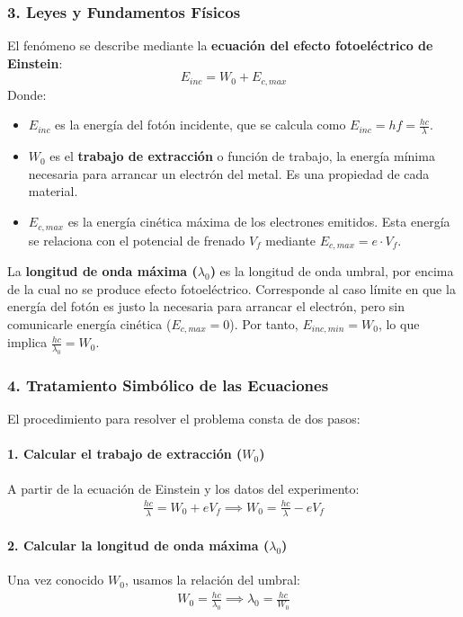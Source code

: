 \subsubsection*{3. Leyes y Fundamentos Físicos}
El fenómeno se describe mediante la \textbf{ecuación del efecto fotoeléctrico de Einstein}:
$$ E_{inc} = W_0 + E_{c,max} $$
\newpage
Donde:
\begin{itemize}
    \item $E_{inc}$ es la energía del fotón incidente, que se calcula como $E_{inc} = hf = \frac{hc}{\lambda}$.
    \item $W_0$ es el \textbf{trabajo de extracción} o función de trabajo, la energía mínima necesaria para arrancar un electrón del metal. Es una propiedad de cada material.
    \item $E_{c,max}$ es la energía cinética máxima de los electrones emitidos. Esta energía se relaciona con el potencial de frenado $V_f$ mediante $E_{c,max} = e \cdot V_f$.
\end{itemize}
La \textbf{longitud de onda máxima ($\lambda_0$)} es la longitud de onda umbral, por encima de la cual no se produce efecto fotoeléctrico. Corresponde al caso límite en que la energía del fotón es justo la necesaria para arrancar el electrón, pero sin comunicarle energía cinética ($E_{c,max}=0$). Por tanto, $E_{inc,min} = W_0$, lo que implica $\frac{hc}{\lambda_0} = W_0$.

\subsubsection*{4. Tratamiento Simbólico de las Ecuaciones}
El procedimiento para resolver el problema consta de dos pasos:
\paragraph{1. Calcular el trabajo de extracción ($W_0$)}
A partir de la ecuación de Einstein y los datos del experimento:
\begin{gather}
    \frac{hc}{\lambda} = W_0 + e V_f \implies W_0 = \frac{hc}{\lambda} - e V_f
\end{gather}
\paragraph{2. Calcular la longitud de onda máxima ($\lambda_0$)}
Una vez conocido $W_0$, usamos la relación del umbral:
\begin{gather}
    W_0 = \frac{hc}{\lambda_0} \implies \lambda_0 = \frac{hc}{W_0}
\end{gather}

